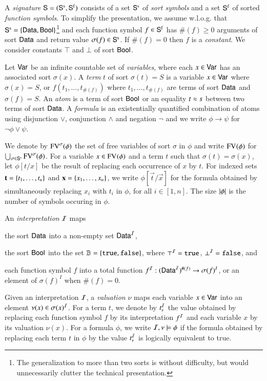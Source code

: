 \documentclass[10pt]{llncs}
\begin{document}
A \emph{signature} $\mathsf{S} = (\mathsf{S}^\mathrm{s},\mathsf{S}^\mathrm{f})$ consists of a
set $\mathsf{S}^\mathrm{s}$ of \emph{sort symbols} and a set $\mathsf{S}^\mathrm{f}$ of
sorted \emph{function symbols}. To simplify the presentation, we
assume w.l.o.g. that $\mathsf{S}^\mathrm{s} = \left\{ \mathsf{Data},\mathsf{Bool} \right\}$\footnote{The
  generalization to more than two sorts is without difficulty, but
  would unnecessarily clutter the technical presentation.} and each
function symbol $f \in \mathsf{S}^\mathrm{f}$ has $\#(f) \geq 0$ arguments of
sort $\mathsf{Data}$ and return value $\sigma(f) \in \mathsf{S}^\mathrm{s}$. If
$\#(f)=0$ then $f$ is a \emph{constant}. We consider constants $\top$
and $\bot$ of sort $\mathsf{Bool}$.

Let $\mathsf{Var}$ be an infinite countable set of \emph{variables}, where
each $x \in \mathsf{Var}$ has an associated sort $\sigma(x)$. A \emph{term}
$t$ of sort $\sigma(t)=S$ is a variable $x \in \mathsf{Var}$ where
$\sigma(x)=S$, or $f(t_1,\ldots,t_{\#(f)})$ where
$t_1,\ldots,t_{\#(f)}$ are terms of sort $\mathsf{Data}$ and $\sigma(f)=S$. An
\emph{atom} is a term of sort $\mathsf{Bool}$ or an equality $t \approx s$
between two terms of sort $\mathsf{Data}$. A \emph{formula} is an
existentially quantified combination of atoms using disjunction
$\vee$, conjunction $\wedge$ and negation $\neg$ and we write $\phi
\rightarrow \psi$ for $\neg\phi \vee \psi$.

We denote by $\mathrm{FV}^{\sigma}(\phi)$ the set of free variables of sort
$\sigma$ in $\phi$ and write $\mathrm{FV}^{}(\phi)$ for $\bigcup_{\sigma \in
  \mathsf{S}^\mathrm{s}} \mathrm{FV}^{\sigma}(\phi)$. For a variable $x \in
\mathrm{FV}^{}(\phi)$ and a term $t$ such that $\sigma(t) = \sigma(x)$, let
$\phi[t/x]$ be the result of replacing each occurrence of $x$ by
$t$. For indexed sets $\mathbf t=\left\{ t_1,\ldots,t_n \right\}$ and
$\mathbf x=\left\{ x_1,\ldots,x_n \right\}$, we write $\phi[\vec{t}/\vec{x}]$ for
the formula obtained by simultaneously replacing $x_i$ with $t_i$ in
$\phi$, for all $i\in[1,n]$. The size ${|{\phi}|}$ is the number of
symbols occuring in $\phi$.

An \emph{interpretation} $\mathcal{I}$ maps\begin{inparaenum}[(1)]
\item the sort $\mathsf{Data}$ into a non-empty set $\mathsf{Data}^{\mathcal{I}}$, 
%
\item the sort $\mathsf{Bool}$ into the set $\mathbb{B} = \left\{ \mathtt{true},\mathtt{false} \right\}$, where
  $\top^{\mathcal{I}} = \mathtt{true}$, $\bot^{\mathcal{I}} = \mathtt{false}$, and
%
\item each function symbol $f$ into a total function $f^{\mathcal{I}} :
  (\mathsf{Data}^{\mathcal{I}})^{\#(f)} \rightarrow \sigma(f)^I$, or an element of
  $\sigma(f)^I$ when $\#(f)=0$.
\end{inparaenum}
Given an interpretation $\mathcal{I}$, a \emph{valuation} $\nu$ maps each
variable $x \in \mathsf{Var}$ into an element $\nu(x) \in \sigma(x)^{\mathcal{I}}$. For
a term $t$, we denote by $t^{\mathcal{I}}_\nu$ the value obtained by replacing
each function symbol $f$ by its interpretation $f^{\mathcal{I}}$ and each
variable $x$ by its valuation $\nu(x)$. For a formula $\phi$, we write
$\mathcal{I},\nu \models \phi$ if the formula obtained by replacing each term
$t$ in $\phi$ by the value $t^{\mathcal{I}}_\nu$ is logically equivalent to true.
\end{document}
